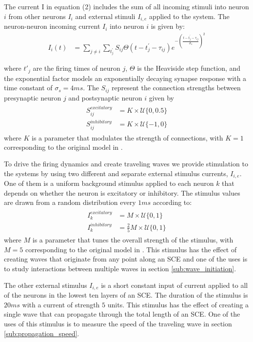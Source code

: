 \documentclass[12pt]{article}
\begin{document}
The current I in equation (2) includes the sum of all incoming stimuli into neuron $i$ from other neurons $I_i$ and external stimuli $I_{i,e}$ applied to the system. 
The neuron-neuron incoming current $I_i$ into neuron $i$ is given by:
\begin{align}
 I_i(t) &= \sum_{j\ne i} \sum_{t^\prime_j} S_{ij}  \Theta(t-t^\prime_j-\tau_{ij})e^{-(\frac{t-t^\prime_j-\tau_{ij}}{\sigma_s})^2}
\end{align}

where $t'_j$ are the firing times of neuron $j$, $\Theta$ is the Heaviside step function, and the exponential factor models an exponentially decaying synapse response with a time constant of $\sigma_s = 4 ms$. 
The $S_{ij}$ represent the connection strengths between presynaptic neuron $j$ and postsynaptic neuron $i$ given by
\begin{align}
 \begin{split}
  S_{ij}^{excitatory} &= K \times \mathcal{U}\{0,0.5 \} \\
  S_{ij}^{inhibitory} &= K \times \mathcal{U}\{-1,0 \} 
 \end{split}
\end{align}
where $K$ is a parameter that modulates the strength of connections, with $K=1$ corresponding to the original model in \parencite{izhikevich2003}. 

To drive the firing dynamics and create traveling waves we provide stimulation to the systems by using two different and separate external stimulus currents, $I_{i,e}$. 
One of them is a uniform background stimulus applied to each neuron $k$ that depends on whether the neuron is excitatory or inhibitory.
The stimulus values are drawn from a random distribution every $1 ms$ according to:
\begin{align}\label{eq:randomstim}
 \begin{split}
  I_k^{excitatory} &= M \times \mathcal{U}\{0,1 \} \\
  I_k^{inhibitory} &= \frac{2}{5} M \times \mathcal{U}\{0,1 \}
 \end{split}
\end{align}
where $M$ is a parameter that tunes the overall strength of the stimulus, with $M=5$ corresponding to the original model in \parencite{izhikevich2003}. 
This stimulus has the effect of creating waves that originate from any point along an SCE and one of the uses is to study interactions between multiple waves in section \ref{sub:wave_initiation}.

The other external stimulus $I_{i,e}$ is a short constant input of current applied to all of the neurons in the lowest ten layers of an SCE. 
The duration of the stimulus is $20 ms$ with a current of strength $5$ units. 
This stimulus has the effect of creating a single wave that can propagate through the total length of an SCE.
One of the uses of this stimulus is to measure the speed of the traveling wave in section \ref{sub:propagation_speed}.
\end{document}
